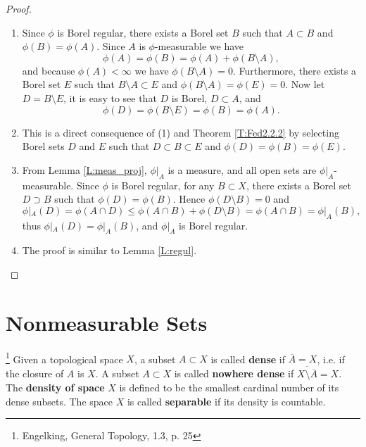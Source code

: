 \begin{proof}  %
\begin{enumerate}
\item[(1)] Since $\phi$ is Borel regular, there exists a Borel set $B$ such that
$A\subset B$ and $\phi(B)=\phi(A)$. Since $A$ is $\phi$-measurable 
we have
\[
  \phi(A)=\phi(B)=\phi(A)+\phi(B\setminus A),
\]
and because $\phi(A)<\infty$ we have $\phi(B\setminus A)=0$.
Furthermore, there exists a Borel set $E$
such that $B\setminus A \subset E$ and $\phi(B\setminus A)=\phi(E)=0$.
Now let $D=B\setminus E$, it is easy to see that $D$ is Borel, $D\subset A$, 
and 
\[
  \phi(D)=\phi(B\setminus E)=\phi(B)=\phi(A).
\]

\item[(2)] This is a direct consequence of (1) and Theorem \ref{T:Fed2.2.2} by 
selecting Borel sets $D$ and $E$ such that $D\subset B\subset E$ and
$\phi(D)=\phi(B)=\phi(E)$.

\item[(3)] From Lemma \ref{L:meas_proj}, $\phi|_A$ is a measure, and all open 
sets are $\phi|_A$-measurable. Since $\phi$ is Borel regular, for any 
$B\subset X$, there exists a Borel set $D\supset B$ such that $\phi(D)=\phi(B)$.
Hence $\phi(D\setminus B)=0$ and
\[
  \phi|_A(D) = \phi(A\cap D) \leq \phi(A\cap B) + \phi(D\setminus B) 
    = \phi(A\cap B) = \phi|_A(B),
\]
thus $\phi|_A(D)=\phi|_A(B)$, and $\phi|_A$ is Borel regular.

\item[(4)] The proof is similar to Lemma \ref{L:regul}.

\end{enumerate}
\end{proof}   %


\section{Nonmeasurable Sets}

\begin{definition} \label{D:dense}
\footnote{Engelking, General Topology, 1.3, p. 25}
Given a topological space $X$, a subset $A\subset X$ is called \textbf{dense}
if $\overline{A}=X$, i.e. if the closure of $A$ is $X$. 
A subset $A\subset X$ is called \textbf{nowhere dense} 
if $\overline{X\setminus \overline{A}}=X$.
The \textbf{density of space} $X$ is defined to be the
smallest cardinal number of its dense subsets. The space $X$ is called
\textbf{separable} 
if its density is countable.
\end{definition}

